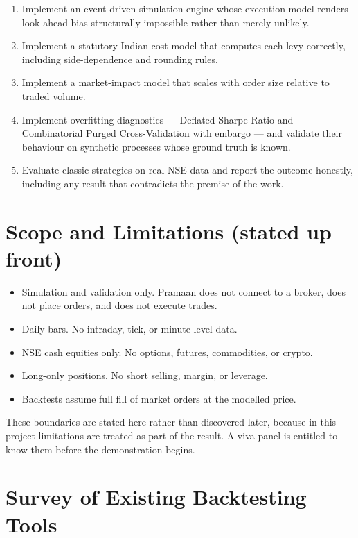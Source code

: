\documentclass[12pt,a4paper,oneside]{report}
\begin{document}
\begin{enumerate}[leftmargin=1cm]
    \item Implement an event-driven simulation engine whose execution model
    renders look-ahead bias structurally impossible rather than merely unlikely.
    \item Implement a statutory Indian cost model that computes each levy
    correctly, including side-dependence and rounding rules.
    \item Implement a market-impact model that scales with order size relative
    to traded volume.
    \item Implement overfitting diagnostics --- Deflated Sharpe Ratio and
    Combinatorial Purged Cross-Validation with embargo --- and validate their
    behaviour on synthetic processes whose ground truth is known.
    \item Evaluate classic strategies on real NSE data and report the outcome
    honestly, including any result that contradicts the premise of the work.
\end{enumerate}

\section{Scope and Limitations (stated up front)}

\begin{itemize}[leftmargin=1.5cm]
    \item Simulation and validation only. Pramaan does not connect to a broker,
    does not place orders, and does not execute trades.
    \item Daily bars. No intraday, tick, or minute-level data.
    \item NSE cash equities only. No options, futures, commodities, or crypto.
    \item Long-only positions. No short selling, margin, or leverage.
    \item Backtests assume full fill of market orders at the modelled price.
\end{itemize}

These boundaries are stated here rather than discovered later, because in this
project limitations are treated as part of the result. A viva panel is entitled
to know them before the demonstration begins.

\section{Survey of Existing Backtesting Tools}
\end{document}
